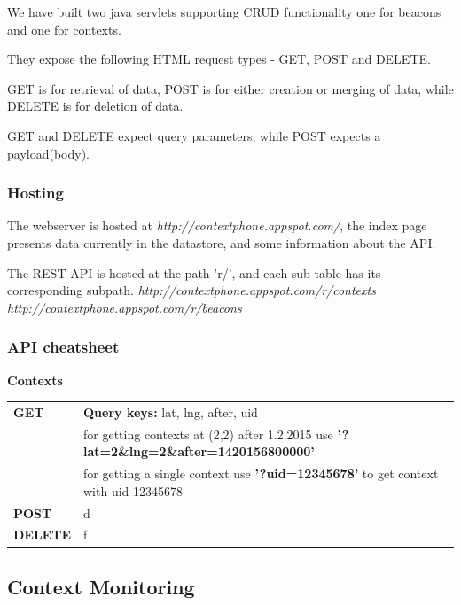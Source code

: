 \documentclass{sigchi}
\begin{document}

We have built two java servlets supporting CRUD functionality one for beacons and one for contexts.

They expose the following HTML request types - GET, POST and DELETE.

GET is for retrieval of data, POST is for either creation or merging of data, while DELETE is for deletion of data.

GET and DELETE expect query parameters, while POST expects a payload(body).

\subsubsection{Hosting}
The webserver is hosted at \textit{http://contextphone.appspot.com/}, the index page presents data currently in the datastore, and some information about the API.

The REST API is hosted at the path 'r/', and each sub table has its corresponding subpath.
\textit{http://contextphone.appspot.com/r/contexts}\\
\textit{http://contextphone.appspot.com/r/beacons}

\subsubsection{API cheatsheet}

\textbf{Contexts}


\begin{tabularx}{.5\textwidth}{  p{}X }
\textbf{GET} & \textbf{Query keys:} lat, lng, after, uid\\
 & for getting contexts at (2,2) after 1.2.2015 use \textbf{'?lat=2\&lng=2\&after=1420156800000'}\\
 & for getting a single context use \textbf{'?uid=12345678'} to get context with uid 12345678\\
\textbf{POST} & d\\
\textbf{DELETE} & f\\
\end{tabularx}

\subsection{Context Monitoring}
\end{document}
